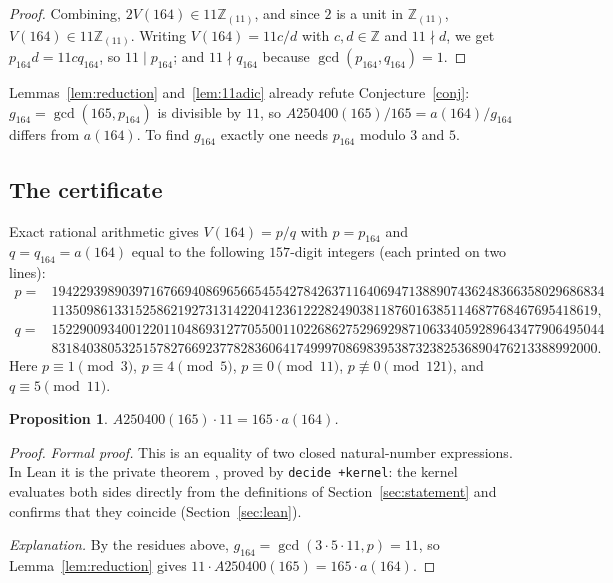 \documentclass[11pt]{amsart}
\theoremstyle{plain}
\newtheorem{proposition}[theorem]{Proposition}
\theoremstyle{definition}
\newcommand{\Z}{\mathbb{Z}}
\newcommand{\Zl}{\mathbb{Z}_{(11)}}
\begin{document}
\begin{proof}
Combining, $2V(164)\in11\Zl$, and since $2$ is a unit in $\Zl$, $V(164)\in 11\Zl$. Writing $V(164)=11c/d$ with $c,d\in\Z$ and $11\nmid d$, we get $p_{164}d=11cq_{164}$, so $11\mid p_{164}$; and $11\nmid q_{164}$ because $\gcd(p_{164},q_{164})=1$.
\end{proof}

Lemmas~\ref{lem:reduction} and~\ref{lem:11adic} already refute Conjecture~\ref{conj}: $g_{164}=\gcd(165,p_{164})$ is divisible by $11$, so $A250400(165)/165=a(164)/g_{164}$ differs from $a(164)$. To find $g_{164}$ exactly one needs $p_{164}$ modulo $3$ and $5$.

\subsection{The certificate}

Exact rational arithmetic gives $V(164)=p/q$ with $p=p_{164}$ and $q=q_{164}=a(164)$ equal to the following $157$-digit integers (each printed on two lines):
{\small
\[
\begin{aligned}
p={}&1942293989039716766940869656654554278426371164069471388907436248366358029686834\\
    &113509861331525862192731314220412361222824903811876016385114687768467695418619,\\[2pt]
q={}&1522900934001220110486931277055001102268627529692987106334059289643477906495044\\
    &831840380532515782766923778283606417499970869839538732382536890476213388992000.
\end{aligned}
\]}
Here $p\equiv1\pmod 3$, $p\equiv4\pmod5$, $p\equiv0\pmod{11}$, $p\not\equiv0\pmod{121}$, and $q\equiv5\pmod{11}$.

\begin{proposition}\label{prop:key}
$A250400(165)\cdot 11=165\cdot a(164)$.
\end{proposition}

\begin{proof}
\emph{Formal proof.} This is an equality of two closed natural-number expressions. In Lean it is the private theorem , proved by \texttt{decide +kernel}: the kernel evaluates both sides directly from the definitions of Section~\ref{sec:statement} and confirms that they coincide (Section~\ref{sec:lean}).

\emph{Explanation.} By the residues above, $g_{164}=\gcd(3\cdot5\cdot11,p)=11$, so Lemma~\ref{lem:reduction} gives $11\cdot A250400(165)=165\cdot a(164)$.
\end{proof}
\end{document}
